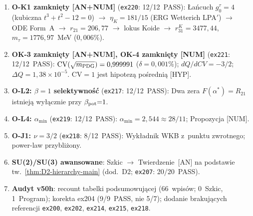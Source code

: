 \begin{remark}
\label{rem:session-v50}
\begin{enumerate}[nosep]
  \item \textbf{O-K1 zamkni\k{e}ty [AN+NUM]} (\texttt{ex220}: 12/12~PASS):
    \L{}a\'ncuch $g_0^\tau{=}4$ (kubiczna $t^3{+}t^2{-}12{=}0$)
    $\to$ $\eta_K{=}181/15$ (ERG Wetterich LPA$'$)
    $\to$ ODE Form~A $\to$ $r_{21}{=}206{,}77$
    $\to$ lokus Koide $\to$ $r_{31}^K{=}3477{,}44$,
    $m_\tau{=}1776{,}97$~MeV ($0{,}006\%$).

  \item \textbf{OK-3 zamkni\k{e}ty [AN+NUM], OK-4 zamkni\k{e}ty [NUM]}
    (\texttt{ex221}: 12/12~PASS):
    $\mathrm{CV}(\sqrt{m_{\rm PDG}}) = 0{,}999991$ ($\delta = 0{,}001\%$);
    $dQ/dCV = -3/2$; $\Delta Q = 1{,}38 \times 10^{-5}$.
    CV${=}1$ jest hipotez\k{a} po\'sredni\k{a} [HYP].

  \item \textbf{O-L2: $\beta{=}1$ selektywno\'s\'c} (\texttt{ex217}: 12/12~PASS):
    Dwa zera $F(\alpha^*){=}R_{21}$ istniej\k{a}
    wy\l{}\k{a}cznie przy $\beta_{\rm pot}{=}1$.

  \item \textbf{O-L4: $\alpha_{\min}$} (\texttt{ex219}: 12/12~PASS):
    $\alpha_{\min} = 2{,}544 \approx 28/11$;
    Propozycja [NUM].

  \item \textbf{O-J1: $\nu = 3/2$} (\texttt{ex218}: 8/12~PASS):
    Wyk\l{}adnik WKB z~punktu zwrotnego; power-law przybli\.zony.

  \item \textbf{SU(2)/SU(3) awansowane}:
    Szkic $\to$ Twierdzenie~[AN] na podstawie
    tw.~\ref{thm:D2-hierarchy-main} (dod.~D2;
    \texttt{ex207}: 20/20~PASS).

  \item \textbf{Audyt v50h}: recount tabelki podsumowuj\k{a}cej
    (66~wpis\'ow; 0~Szkic, 1~Program);
    korekta ex204 (9/9~PASS, nie 5/7);
    dodanie brakuj\k{a}cych referencji
    \texttt{ex200}, \texttt{ex202}, \texttt{ex214},
    \texttt{ex215}, \texttt{ex218}.
\end{enumerate}
\end{remark}
